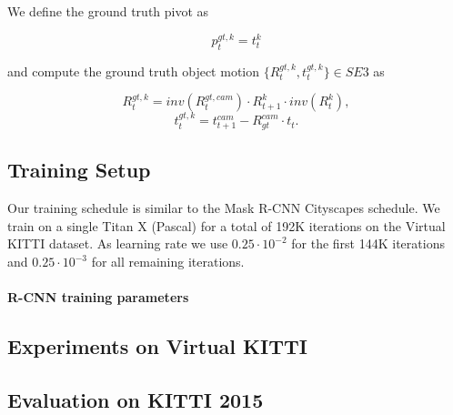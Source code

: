 We define the ground truth pivot as

\begin{equation}
p_{t}^{gt, k} = t_t^k
\end{equation}

and compute the ground truth object motion
$\{R_t^{gt, k}, t_t^{gt, k}\} \in SE3$ as

\begin{equation}
R_{t}^{gt, k} = inv(R_{t}^{gt, cam}) \cdot R_{t+1}^k \cdot inv(R_t^k),
\end{equation}
\begin{equation}
t_{t}^{gt, k} = t_{t+1}^{cam}  - R_{gt}^{cam} \cdot t_t.
\end{equation} %

\subsection{Training Setup}
Our training schedule is similar to the Mask R-CNN Cityscapes schedule.
We train on a single Titan X (Pascal) for a total of 192K iterations on the
Virtual KITTI dataset. As learning rate we use $0.25 \cdot 10^{-2}$ for the
first 144K iterations and $0.25 \cdot 10^{-3}$ for all remaining iterations.

\paragraph{R-CNN training parameters}

\subsection{Experiments on Virtual KITTI}

\subsection{Evaluation on KITTI 2015}
